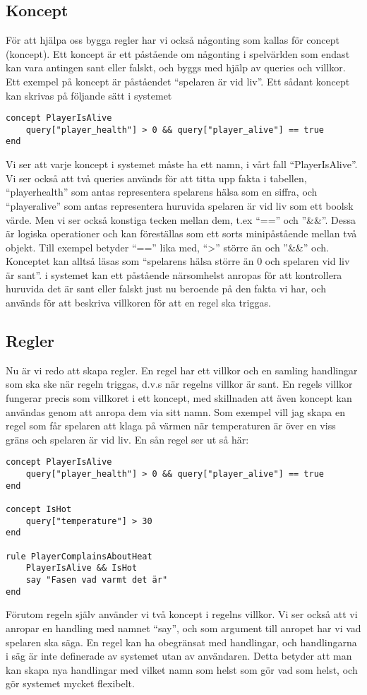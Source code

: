 \documentclass{TDP005mall}
\begin{document}
\subsection{Koncept}
För att hjälpa oss bygga regler har vi också någonting som kallas för concept (koncept).
Ett koncept är ett påstående om någonting i spelvärlden som endast kan vara antingen sant eller
falskt, och byggs med hjälp av queries och villkor. Ett exempel på koncept är påståendet
``spelaren är vid liv''. Ett sådant koncept kan skrivas på följande sätt i systemet
\begin{lstlisting}
concept PlayerIsAlive
    query["player_health"] > 0 && query["player_alive"] == true
end
\end{lstlisting}
Vi ser att varje koncept i systemet måste ha ett namn, i vårt fall ``PlayerIsAlive''.
Vi ser också att två queries används för att titta upp fakta i tabellen, ``player\textunderscore health''
som antas representera spelarens hälsa som en siffra, och ``player\textunderscore alive'' som antas
representera huruvida spelaren är vid liv som ett boolsk värde. Men vi ser också konstiga tecken
mellan dem, t.ex ``=='' och ''\&\&''. Dessa är logiska operationer och kan föreställas som
ett sorts minipåstående mellan två objekt. Till exempel betyder ``=='' lika med, ``>'' större än
och ''\&\&'' och. Konceptet kan alltså läsas som ``spelarens hälsa större än 0 och spelaren vid liv är sant''.
i systemet kan ett påstående närsomhelst anropas för att kontrollera huruvida det
är sant eller falskt just nu beroende på den fakta vi har, och används för att beskriva
villkoren för att en regel ska triggas.

\subsection{Regler}
Nu är vi redo att skapa regler. En regel har ett villkor och en samling handlingar som ska ske
när regeln triggas, d.v.s när regelns villkor är sant. En regels villkor fungerar precis som
villkoret i ett koncept, med skillnaden att även koncept kan användas genom att anropa dem via
sitt namn. Som exempel vill jag skapa en regel som får spelaren att klaga på värmen när
temperaturen är över en viss gräns och spelaren är vid liv. En sån regel ser ut så här:
\begin{lstlisting}
concept PlayerIsAlive
    query["player_health"] > 0 && query["player_alive"] == true
end

concept IsHot
    query["temperature"] > 30
end

rule PlayerComplainsAboutHeat
    PlayerIsAlive && IsHot
    say "Fasen vad varmt det är"
end
\end{lstlisting}
Förutom regeln själv använder vi två koncept i regelns villkor. Vi ser också att vi anropar
en handling med namnet ``say'', och som argument till anropet har vi vad spelaren ska säga.
En regel kan ha obegränsat med handlingar, och handlingarna i säg är inte definerade av systemet
utan av användaren. Detta betyder att man kan skapa nya handlingar med vilket namn som helst som gör
vad som helst, och gör systemet mycket flexibelt.
\end{document}
